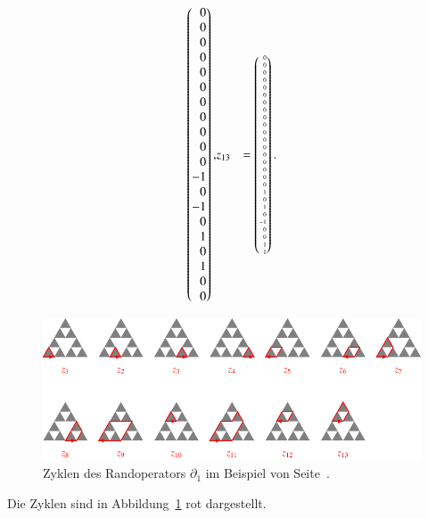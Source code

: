 \begin{beispiel}
\begin{align*}
\begin{pmatrix*}[r]
 0\\
 0\\
 0\\ %
 0\\
 0\\
 0\\
 0\\
 0\\ %
 0\\
 0\\
 0\\
-1\\
 0\\ %
-1\\
 0\\
 1\\
 0\\
 1\\ %
 0\\
 0
\end{pmatrix*},
&z_{13} %
&=
\tiny
\begin{pmatrix*}[r]
 0\\
 0\\
 0\\
 0\\
 0\\
 0\\
 0\\
 0\\
 0\\
 0\\
 0\\
 0\\
 0\\
 0\\
 0\\
 0\\
 0\\
 0\\
 1\\
 0\\ %
 1\\
 0\\
-1\\
 0\\
 0\\ %
 1\\
 1
\end{pmatrix*}.
\end{align*}
\begin{figure}
\centering
\includegraphics{chapters/95-homologie/images/homocycles.pdf}
\caption{Zyklen des Randoperators $\partial_1$ im Beispiel von
Seite~\pageref{buch:homologie:beispiel:gausshomo}.
\label{buch:homologie:fig:homocycles}}
\end{figure}%
Die Zyklen sind in Abbildung~\ref{buch:homologie:fig:homocycles} {\color{red}rot} dargestellt.
\end{beispiel}

